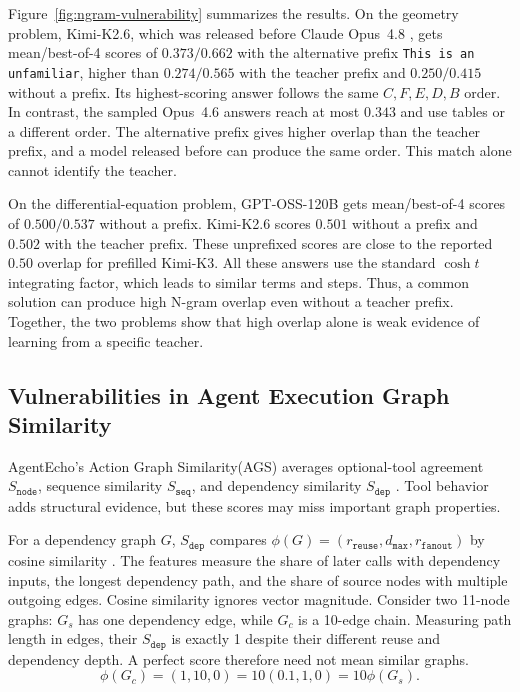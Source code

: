 Figure~\ref{fig:ngram-vulnerability} summarizes the results. On the geometry
problem, Kimi-K2.6, which was released before Claude Opus~4.8
\citep{team2025kimi,anthropic2026opus48}, gets mean/best-of-4 scores of
$0.373/0.662$ with the alternative prefix \texttt{This is an unfamiliar},
higher than $0.274/0.565$ with the teacher prefix and $0.250/0.415$ without a
prefix. Its highest-scoring answer follows the same $C,F,E,D,B$ order. In contrast, the sampled Opus~4.6 answers reach at most
$0.343$ and use tables or a different order. The alternative prefix gives
higher overlap than the teacher prefix, and a model released before
can produce the same order. This match alone cannot identify the teacher.

On the differential-equation problem, GPT-OSS-120B gets mean/best-of-4 scores
of $0.500/0.537$ without a prefix. Kimi-K2.6 scores $0.501$ without a prefix
and $0.502$ with the teacher prefix. These unprefixed scores are close to the
reported $0.50$ overlap for prefilled Kimi-K3. All these answers use the
standard $\cosh t$ integrating factor, which leads to similar terms and steps.
Thus, a common solution can produce high N-gram overlap even without a teacher
prefix. Together, the two problems show that high overlap alone is weak
evidence of learning from a specific teacher.


\subsection{Vulnerabilities in Agent Execution Graph Similarity}
\label{sec:dependency-ambiguity}
AgentEcho's Action Graph Similarity(AGS) averages optional-tool agreement
$S_{\mathtt{node}}$, sequence similarity $S_{\mathtt{seq}}$, and dependency
similarity $S_{\mathtt{dep}}$ \citep{yang2026agents}. Tool behavior adds
structural evidence, but these scores may miss important graph properties.

For a dependency graph $G$, $S_{\mathtt{dep}}$ compares
$\phi(G)=(r_{\mathtt{reuse}},d_{\mathtt{max}},r_{\mathtt{fanout}})$ by cosine
similarity \citep[Appendix~B.4]{yang2026agents}. The features measure the
share of later calls with dependency inputs, the longest dependency path,
and the share of source nodes with multiple outgoing edges. Cosine similarity
ignores vector magnitude. Consider two 11-node graphs: $G_s$ has one
dependency edge, while $G_c$ is a 10-edge chain. Measuring path length in edges, their $S_{\mathtt{dep}}$ is exactly 1 despite their different reuse and
dependency depth. A perfect score therefore need not mean similar graphs.
\begin{equation}
    \phi(G_c)=(1,10,0)=10(0.1,1,0)=10\phi(G_s).
    \label{eq:dependency-counterexample}
\end{equation}



